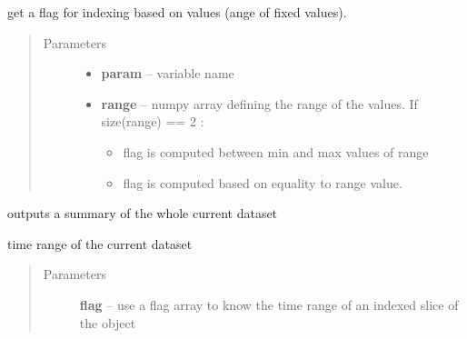 \documentclass[letterpaper,10pt,english]{sphinxmanual}
\begin{document}
\begin{fulllineitems}
\begin{fulllineitems}
\end{fulllineitems}


\begin{fulllineitems}
\label{altimetry.data:altimetry.data.hydro_data.slice}
get a flag for indexing based on values (ange of fixed values).
\begin{quote}\begin{description}
\item[{Parameters}] \leavevmode\begin{itemize}
\item {} 
\textbf{param} -- variable name

\item {} 
\textbf{range} -- 
numpy array defining the range of the values. If size(range) == 2 :
\begin{itemize}
\item {} 
flag is computed between min and max values of range

\item {} 
flag is computed based on equality to range value.

\end{itemize}


\end{itemize}

\end{description}\end{quote}

\end{fulllineitems}


\begin{fulllineitems}
\label{altimetry.data:altimetry.data.hydro_data.summary}
outputs a summary of the whole current dataset

\end{fulllineitems}


\begin{fulllineitems}
\label{altimetry.data:altimetry.data.hydro_data.time_range}
time range of the current dataset
\begin{quote}\begin{description}
\item[{Parameters}] \leavevmode
\textbf{flag} -- use a flag array to know the time range of an indexed slice of the object


\end{description}
\end{quote}
\end{fulllineitems}
\end{fulllineitems}
\end{document}
